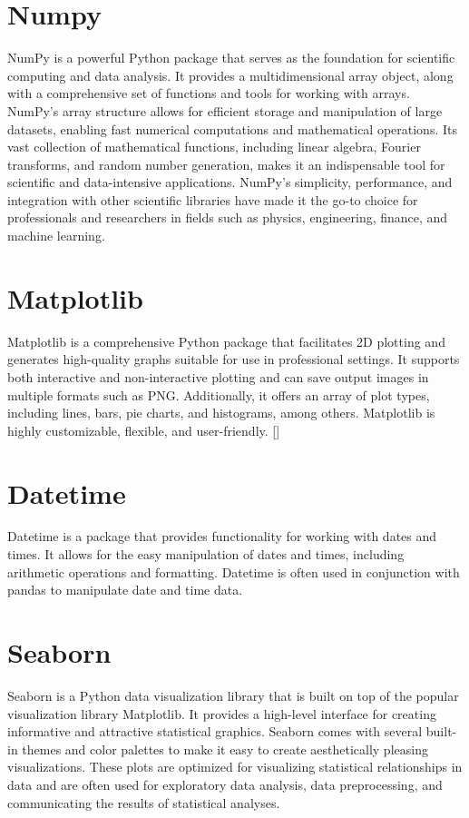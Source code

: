 \section{Numpy}

NumPy is a powerful Python package that serves as the foundation for scientific computing and data analysis. It provides a multidimensional array object, along with a comprehensive set of functions and tools for working with arrays. NumPy's array structure allows for efficient storage and manipulation of large datasets, enabling fast numerical computations and mathematical operations. Its vast collection of mathematical functions, including linear algebra, Fourier transforms, and random number generation, makes it an indispensable tool for scientific and data-intensive applications. NumPy's simplicity, performance, and integration with other scientific libraries have made it the go-to choice for professionals and researchers in fields such as physics, engineering, finance, and machine learning.

\section{Matplotlib}

Matplotlib is a comprehensive Python package that facilitates 2D plotting and generates high-quality graphs suitable for use in professional settings. It supports both interactive and non-interactive plotting and can save output images in multiple formats such as PNG. Additionally, it offers an array of plot types, including lines, bars, pie charts, and histograms, among others. Matplotlib is highly customizable, flexible, and user-friendly. [\cite{Tosi:2009}]

\section{Datetime}

Datetime is a package that provides functionality for working with dates and times. It allows for the easy manipulation of dates and times, including arithmetic operations and formatting. Datetime is often used in conjunction with pandas to manipulate date and time data.

\section{Seaborn}

Seaborn is a Python data visualization library that is built on top of the popular visualization library Matplotlib. It provides a high-level interface for creating informative and attractive statistical graphics. Seaborn comes with several built-in themes and color palettes to make it easy to create aesthetically pleasing visualizations. These plots are optimized for visualizing statistical relationships in data and are often used for exploratory data analysis, data preprocessing, and communicating the results of statistical analyses.

